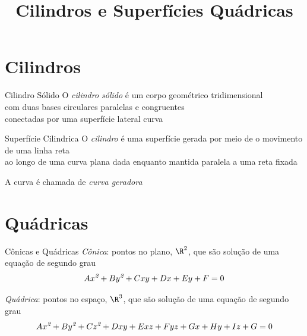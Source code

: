 \documentclass[fleqn,utf8,aspectratio=169,12pt]{beamer}
\title{Cilindros e Superfícies Quádricas}
\begin{document}
\addtitle

\section{Cilindros}

\begin{frame}{Cilindro Sólido}
  O \emph{cilindro sólido} é um corpo geométrico tridimensional \\
  com duas bases circulares paralelas e congruentes \\
  conectadas por uma superfície lateral curva
\end{frame}


\begin{frame}{Superfície Cilindrica}
  O \emph{cilindro} é uma superfície gerada
  por meio de o movimento de uma linha reta \\
  ao longo de uma curva plana dada
  enquanto mantida paralela a uma reta fixada

  A curva é chamada de \emph{curva geradora}
\end{frame}


\section{Quádricas}

\begin{frame}{Cônicas e Quádricas}
  \emph{Cônica}:
  pontos no plano, $\R^2$, que são solução de uma equação de segundo grau
  \[
    Ax^{\emph{2}} + By^{\emph{2}} + Cxy + Dx + Ey + F = 0
  \]

  \pause
  \emph{Quádrica}:
  pontos no espaço, $\R^3$, que são solução de uma equação de segundo grau
  \[
    Ax^{\emph{2}} + By^{\emph{2}} + Cz^{\emph{2}} +
    Dxy  + Exz  + Fyz +
    Gx   + Hy   + Iz + G = 0
  \]
\end{frame}
\end{document}
